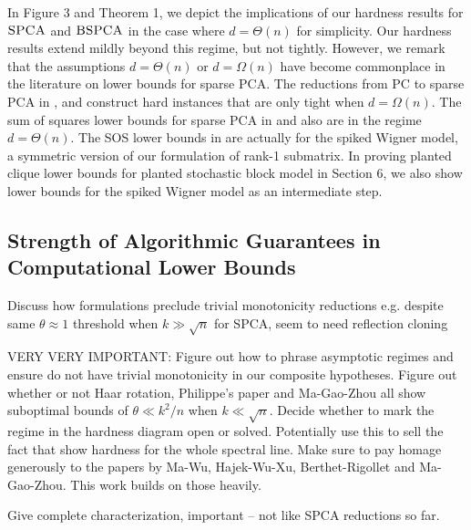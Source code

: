 \documentclass[11pt]{article}
\begin{document}
In Figure 3 and Theorem 1, we depict the implications of our hardness results for $\textsc{SPCA}$ and $\textsc{BSPCA}$ in the case where $d = \Theta(n)$ for simplicity. Our hardness results extend mildly beyond this regime, but not tightly. However, we remark that the assumptions $d = \Theta(n)$ or $d = \Omega(n)$ have become commonplace in the literature on lower bounds for sparse PCA. The reductions from PC to sparse PCA in \cite{berthet2013complexity}, \cite{wang2016statistical} and \cite{gao2017sparse} construct hard instances that are only tight when $d = \Omega(n)$. The sum of squares lower bounds for sparse PCA in \cite{ma2015sum} and \cite{hopkins2017power} also are in the regime $d = \Theta(n)$. The SOS lower bounds in \cite{hopkins2017power} are actually for the spiked Wigner model, a symmetric version of our formulation of rank-1 submatrix. In proving planted clique lower bounds for planted stochastic block model in Section 6, we also show lower bounds for the spiked Wigner model as an intermediate step.

\subsection{Strength of Algorithmic Guarantees in Computational Lower Bounds}

Discuss how formulations preclude trivial monotonicity reductions e.g. despite same $\theta \approx 1$ threshold when $k \gg \sqrt{n}$ for SPCA, seem to need reflection cloning

VERY VERY IMPORTANT: Figure out how to phrase asymptotic regimes and ensure do not have trivial monotonicity in our composite hypotheses. Figure out whether or not Haar rotation, Philippe's paper and Ma-Gao-Zhou all show suboptimal bounds of $\theta \ll k^2/n$ when $k \ll \sqrt{n}$. Decide whether to mark the regime in the hardness diagram open or solved. Potentially use this to sell the fact that show hardness for the whole spectral line. Make sure to pay homage generously to the papers by Ma-Wu, Hajek-Wu-Xu, Berthet-Rigollet and Ma-Gao-Zhou. This work builds on those heavily.

Give complete characterization, important -- not like SPCA reductions so far.
\end{document}
